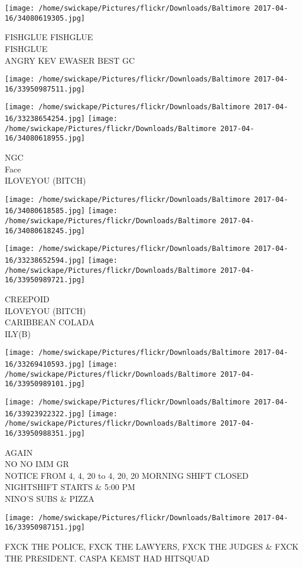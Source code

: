 \documentclass[10pt,letterpaper]{article}
\begin{document}
\texttt{[image: /home/swickape/Pictures/flickr/Downloads/Baltimore 2017-04-16/34080619305.jpg]}

FISHGLUE FISHGLUE\\
FISHGLUE\\
ANGRY KEV EWASER BEST GC\\
\pagebreak

\texttt{[image: /home/swickape/Pictures/flickr/Downloads/Baltimore 2017-04-16/33950987511.jpg]}

\vspace{0.25in}
\texttt{[image: /home/swickape/Pictures/flickr/Downloads/Baltimore 2017-04-16/33238654254.jpg]}
\texttt{[image: /home/swickape/Pictures/flickr/Downloads/Baltimore 2017-04-16/34080618955.jpg]}

NGC\\
Face\\
ILOVEYOU (BITCH)\\
\pagebreak

\texttt{[image: /home/swickape/Pictures/flickr/Downloads/Baltimore 2017-04-16/34080618585.jpg]}
\texttt{[image: /home/swickape/Pictures/flickr/Downloads/Baltimore 2017-04-16/34080618245.jpg]}

\texttt{[image: /home/swickape/Pictures/flickr/Downloads/Baltimore 2017-04-16/33238652594.jpg]}
\texttt{[image: /home/swickape/Pictures/flickr/Downloads/Baltimore 2017-04-16/33950989721.jpg]}

CREEPOID\\
ILOVEYOU (BITCH)\\
CARIBBEAN COLADA\\
ILY(B)\\
\pagebreak

\texttt{[image: /home/swickape/Pictures/flickr/Downloads/Baltimore 2017-04-16/33269410593.jpg]}
\texttt{[image: /home/swickape/Pictures/flickr/Downloads/Baltimore 2017-04-16/33950989101.jpg]}

\texttt{[image: /home/swickape/Pictures/flickr/Downloads/Baltimore 2017-04-16/33923922322.jpg]}
\texttt{[image: /home/swickape/Pictures/flickr/Downloads/Baltimore 2017-04-16/33950988351.jpg]}

AGAIN\\
NO NO IMM GR\\
NOTICE FROM 4, 4, 20 to 4, 20, 20 MORNING SHIFT CLOSED NIGHTSHIFT STARTS \& 5:00 PM\\
NINO'S SUBS \& PIZZA\\
\pagebreak

\texttt{[image: /home/swickape/Pictures/flickr/Downloads/Baltimore 2017-04-16/33950987151.jpg]}

FXCK THE POLICE, FXCK THE LAWYERS, FXCK THE JUDGES \& FXCK THE PRESIDENT.  CASPA KEMST HAD HITSQUAD\\
\pagebreak
\end{document}
